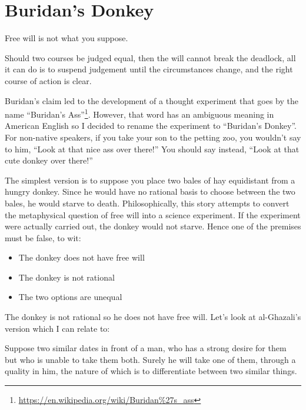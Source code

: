 \section{Buridan’s Donkey}

Free will is not what you suppose.

\begin{quotex}
Should two courses be judged equal, then the will cannot break the deadlock, all it can do is to suspend judgement until the circumstances change, and the right course of action is clear.
\end{quotex}


Buridan's claim led to the development of a thought experiment that goes by the name ``Buridan's Ass''\footnote{\url{https://en.wikipedia.org/wiki/Buridan\%27s\_ass}}. However, that word has an ambiguous meaning in American English so I decided to rename the experiment to ``Buridan's Donkey''. For non-native speakers, if you take your son to the petting zoo, you wouldn't say to him, ``Look at that nice ass over there!'' You should say instead, ``Look at that cute donkey over there!''

The simplest version is to suppose you place two bales of hay equidistant from a hungry donkey. Since he would have no rational basis to choose between the two bales, he would starve to death. Philosophically, this story attempts to convert the metaphysical question of free will into a science experiment. If the experiment were actually carried out, the donkey would not starve. Hence one of the premises must be false, to wit:

\begin{itemize}


\item The donkey does not have free will

\item The donkey is not rational

\item The two options are unequal
\end{itemize}


The donkey is not rational so he does not have free will. Let's look at al-Ghazali's version which I can relate to:

\begin{quotex}
Suppose two similar dates in front of a man, who has a strong desire for them but who is unable to take them both. Surely he will take one of them, through a quality in him, the nature of which is to differentiate between two similar things.
\end{quotex}


